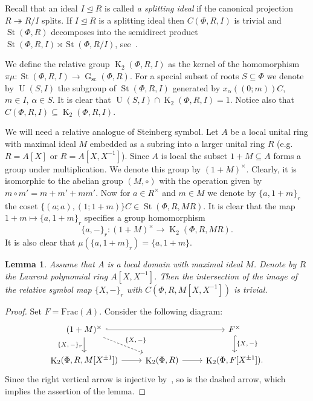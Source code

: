 \documentclass[oneside, 10pt]{amsart}
\DeclareMathOperator{\St}{St}
\DeclareMathOperator{\G}{G}
\DeclareMathOperator{\UU}{U}
\newcommand{\Gsc}{\G_\mathrm{sc}}
\DeclareMathOperator{\K}{K}
\newcommand{\inv}{^{-1}}
\numberwithin{equation}{section}
\numberwithin{thm}{section}
\newtheorem{lemma}[thm]{Lemma}
\numberwithin{lemma}{section}
\theoremstyle{definition}
\theoremstyle{remark}
\begin{document}
Recall that an ideal $I \trianglelefteq R$ is called \textit{a splitting ideal} if the canonical projection $R \twoheadrightarrow R/I$ splits.
If $I \trianglelefteq R$ is a splitting ideal then $C(\Phi, R, I)$ is trivial and $\St(\Phi, R)$ decomposes into the semidirect product
$\St(\Phi, R, I) \rtimes \St(\Phi, R/I)$, see~\cite[\S~1]{LS17}.

We define the relative group $\K_2(\Phi, R, I)$ as the kernel of the homomorphism $\pi \mu \colon \St(\Phi,R, I) \to \Gsc(\Phi, R)$.
For a special subset of roots $S \subseteq \Phi$ we denote by $\UU(S, I)$ the subgroup of $\St(\Phi, R, I)$ generated by $x_\alpha((0;m))C$, $m \in I$, $\alpha \in S$.
It is clear that $\UU(S, I) \cap \K_2(\Phi, R, I) = 1$.
Notice also that $C(\Phi, R, I) \subseteq \K_2(\Phi, R, I)$.

We will need a relative analogue of Steinberg symbol.
Let $A$ be a local unital ring with maximal ideal $M$ embedded as a subring into a larger unital ring $R$ (e.g. $R = A[X]$ or $R = A[X, X\inv]$).
Since $A$ is local the subset $1+M \subseteq A$ forms a group under multiplication.
We denote this group by $(1+M)^\times$.
Clearly, it is isomorphic to the abelian group $(M, \circ)$ with the operation given by $m \circ m' = m + m' + mm'$.
Now for $a \in R^\times$ and $m \in M$ we denote by $\{a, 1+m\}_r$ the coset $\{(a; a), (1; 1+m)\}C \in \St(\Phi, R, MR)$.
It is clear that the map $1+m \mapsto \{a, 1+m\}_r$ specifies a group homomorphism
\begin{equation} \label{eq:relative-symbol} \{ a, -\}_r \colon (1+M)^\times \to \K_2(\Phi, R, MR). \end{equation}
It is also clear that $\mu(\{a, 1+m\}_r) = \{a, 1+m\}$.

\begin{lemma}\label{lem:symbols}
Assume that $A$ is a local domain with maximal ideal $M$.
Denote by $R$ the Laurent polynomial ring $A[X, X\inv]$.
Then the intersection of the image of the relative symbol map $\{X, -\}_r$ with $C(\Phi, R, M[X, X\inv])$ is trivial.
\end{lemma}
\begin{proof}
Set $F = \mathrm{Frac}(A)$.
Consider the following diagram:
\[\begin{tikzcd}
(1+M)^\times \ar[hookrightarrow, rr] \arrow{d}[swap]{\{X {,}\, -\}_r} \ar[rd, dashed, "\{X{,}\, -\}"] &  & F^\times \ar[hookrightarrow, d, "\{X{,}\, -\}"] \\
\K_2(\Phi ,R, M[X^{\pm 1}]) \ar[r] & \K_2(\Phi, R) \ar[r] & \K_2(\Phi, F[X^{\pm 1}]).
\end{tikzcd}\]
Since the right vertical arrow is injective by~\cite[Lemma~2.2]{LS20}, so is the dashed arrow,
 which implies the assertion of the lemma.
\end{proof}
\end{document}

